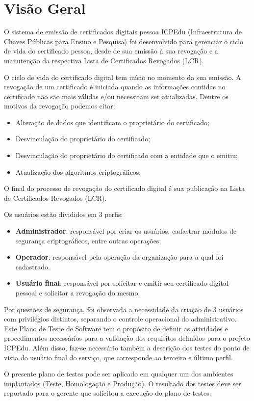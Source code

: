 \section{Visão Geral}

O sistema de emissão de certificados digitais pessoa ICPEdu (Infraestrutura de Chaves Públicas para Ensino e Pesquisa) foi desenvolvido para gerenciar o ciclo de vida do certificado pessoa, desde de sua emissão à sua revogação e a manutenção da respectiva Lista de Certificados Revogados (LCR).

O ciclo de vida do certificado digital tem início no momento da sua emissão. 
A revogação de um certificado é iniciada quando as informações contidas no certificado não são mais válidas e/ou necessitam ser atualizadas. Dentre os motivos da revogação podemos citar:

\begin{itemize}
  \item Alteração de dados que identificam o proprietário do certificado;
  \item Desvinculação do proprietário do certificado;
  \item Desvinculação do proprietário do certificado com a entidade que o emitiu;
  \item Atualização dos algoritmos criptográficos;
\end{itemize}

O final do processo de revogação do certificado digital é sua publicação na Lista de Certificados Revogados (LCR).

Os usuários estão divididos em 3 perfis:

\begin{itemize}
  \item \textbf{Administrador}: responsável por criar os usuários, cadastrar módulos de segurança criptográficos, entre outras operações;
  \item \textbf{Operador}: responsável pela operação da organização para a qual foi cadastrado.
  \item \textbf{Usuário final}: responsável por solicitar e emitir seu certificado digital pessoal e solicitar a revogação do mesmo.
\end{itemize}

Por questões de segurança, foi observada a necessidade da criação de 3 usuários com privilégios distintos, separando o controle operacional do administrativo. Este Plano de Teste de Software tem o propósito de definir as atividades e procedimentos necessários para a validação dos requisitos definidos para o projeto ICPEdu. Além disso, faz-se necessário também a descrição dos testes do ponto de vista do usuário final do serviço, que corresponde ao terceiro e último perfil.

O presente plano de testes pode ser aplicado em qualquer um dos ambientes implantados (Teste, Homologação e Produção). O resultado dos testes deve ser reportado para o gerente que solicitou a execução do plano de testes.


\nocite{*}